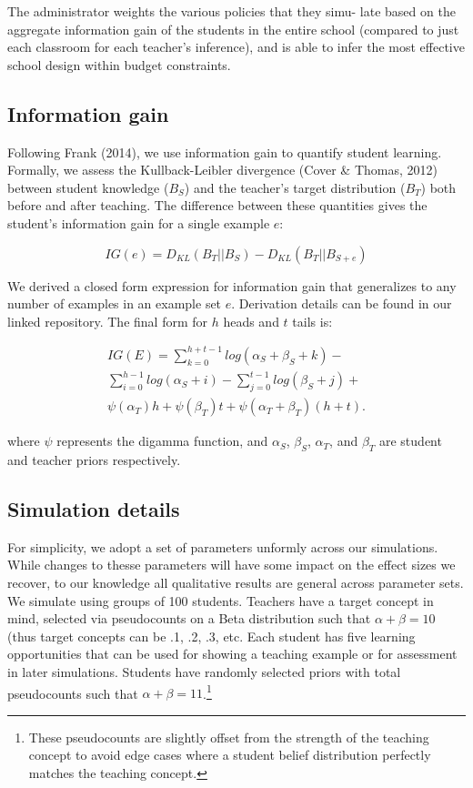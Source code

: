 \documentclass[10pt, letterpaper]{article}
\begin{document}
The administrator weights the various policies that they simu- late
based on the aggregate information gain of the students in the entire
school (compared to just each classroom for each teacher's inference),
and is able to infer the most effective school design within budget
constraints.

\subsection{Information gain}\label{information-gain}

Following Frank (2014), we use information gain to quantify student
learning. Formally, we assess the Kullback-Leibler divergence (Cover \&
Thomas, 2012) between student knowledge (\(B_S\)) and the teacher's
target distribution (\(B_T\)) both before and after teaching. The
difference between these quantities gives the student's information gain
for a single example \(e\):

\[IG(e) = D_{KL}(B_T ||B_S) - D_{KL}(B_T || B_{S+e})\]

We derived a closed form expression for information gain that
generalizes to any number of examples in an example set \(e\).
Derivation details can be found in our linked repository. The final form
for \(h\) heads and \(t\) tails is:

\begin{multline}
IG(E) = \sum_{k=0}^{h+t-1} {log(\alpha_S + \beta_S + k)} - \\
\sum_{i=0}^{h-1} {log (\alpha_S + i)} - \sum_{j=0}^{t-1} {log(\beta_S +j)} + \\
\psi(\alpha_T)h + \psi(\beta_T)t +  \psi(\alpha_T + \beta_T)(h+t).
\end{multline}

\noindent where \(\psi\) represents the digamma function, and
\(\alpha_S\), \(\beta_S\), \(\alpha_T\), and \(\beta_T\) are student and
teacher priors respectively.

\subsection{Simulation details}\label{simulation-details}

For simplicity, we adopt a set of parameters unformly across our
simulations. While changes to thesse parameters will have some impact on
the effect sizes we recover, to our knowledge all qualitative results
are general across parameter sets. We simulate using groups of 100
students. Teachers have a target concept in mind, selected via
pseudocounts on a Beta distribution such that \(\alpha + \beta = 10\)
(thus target concepts can be .1, .2, .3, etc. Each student has five
learning opportunities that can be used for showing a teaching example
or for assessment in later simulations. Students have randomly selected
priors with total pseudocounts such that
\(\alpha + \beta = 11\).\footnote{These pseudocounts are slightly offset from the strength of the teaching concept to avoid edge cases where a student belief distribution perfectly matches the teaching concept.}
\end{document}

